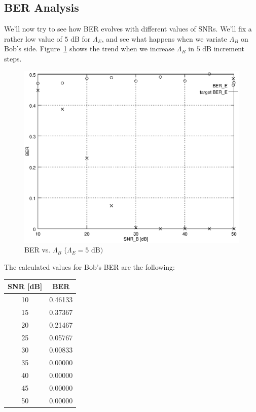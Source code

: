\documentclass[a4paper,12pt,titlepage]{article}
\begin{document}
\subsection*{BER Analysis}
We'll now try to see how BER evolves with different values of SNRs. We'll fix a
rather low value of $5 \text{ dB}$ for $\Lambda_E$, and see what happens when
we variate $\Lambda_B$ on Bob's side. Figure~\ref{fig:awgn_ber} shows the
trend when we increase $\Lambda_B$ in $5 \text{ dB}$ increment steps.

\begin{figure}[h]
  \centering
  \includegraphics[scale=0.8]{awgn_ber.eps}
  \caption{BER vs.
  $\Lambda_B$ ($\Lambda_E = 5 \text{ dB})$}
  \label{fig:awgn_ber}
\end{figure}

The calculated values for Bob's BER are the following:

\begin{tabular}{ | c | c | }
  \hline
  \textbf{SNR [dB]} & \textbf{BER} \\
  \hline
  10 & 0.46133 \\
  15 & 0.37367 \\
  20 & 0.21467 \\
  25 & 0.05767 \\
  30 & 0.00833 \\
  35 & 0.00000 \\
  40 & 0.00000 \\
  45 & 0.00000 \\
  50 & 0.00000 \\
  \hline
\end{tabular}
\end{document}
